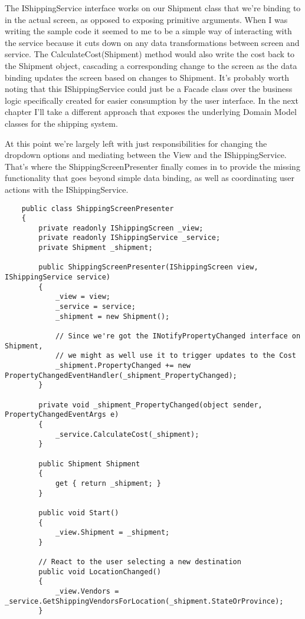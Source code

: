 \documentclass{article}
\begin{document}
{The IShippingService interface works on our Shipment class that we're binding to in the actual screen, as opposed to exposing primitive arguments.  When I was writing the sample code it seemed to me to be a simple way of interacting with the service because it cuts down on any data transformations between screen and service.  The CalculateCost(Shipment) method would also write the cost back to the Shipment object, cascading a corresponding change to the screen as the data binding updates the screen based on changes to Shipment.  It's probably worth noting that this IShippingService could just be a Facade class over the business logic specifically created for easier consumption by the user interface.  In the next chapter I'll take a different approach that exposes the underlying Domain Model classes for the shipping system.

At this point we're largely left with just responsibilities for changing the dropdown options and mediating between the View and the IShippingService.  That's where the ShippingScreenPresenter finally comes in to provide the missing functionality that goes beyond simple data binding, as well as coordinating user actions with the IShippingService.
\newpage
\begin{lstlisting}
    public class ShippingScreenPresenter
    {
        private readonly IShippingScreen _view;
        private readonly IShippingService _service;
        private Shipment _shipment; 

        public ShippingScreenPresenter(IShippingScreen view, IShippingService service)
        {
            _view = view;
            _service = service;
            _shipment = new Shipment(); 

            // Since we're got the INotifyPropertyChanged interface on Shipment,
            // we might as well use it to trigger updates to the Cost
            _shipment.PropertyChanged += new PropertyChangedEventHandler(_shipment_PropertyChanged);
        }  

        private void _shipment_PropertyChanged(object sender, PropertyChangedEventArgs e)
        {
            _service.CalculateCost(_shipment);
        } 

        public Shipment Shipment
        {
            get { return _shipment; }
        } 

        public void Start()
        {
            _view.Shipment = _shipment;
        } 

        // React to the user selecting a new destination		
        public void LocationChanged()
        {
            _view.Vendors = _service.GetShippingVendorsForLocation(_shipment.StateOrProvince);
        } 


\end{lstlisting}}
\end{document}
